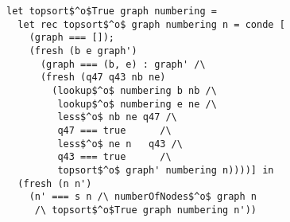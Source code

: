 \begin{figure}[!t]
  \centering
  \begin{minipage}{0.49\textwidth}
    \begin{lstlisting}[label={topsort_spec}, caption={Specialized relational intepreter for topologic sort of a graph}, captionpos=b, frame=tb]
let topsort$^o$True graph numbering =
  let rec topsort$^o$ graph numbering n = conde [
    (graph === []);
    (fresh (b e graph')
      (graph === (b, e) : graph' /\
      (fresh (q47 q43 nb ne)
        (lookup$^o$ numbering b nb /\
         lookup$^o$ numbering e ne /\
         less$^o$ nb ne q47 /\
         q47 === true      /\
         less$^o$ ne n   q43 /\
         q43 === true      /\
         topsort$^o$ graph' numbering n))))] in
  (fresh (n n')
    (n' === s n /\ numberOfNodes$^o$ graph n
     /\ topsort$^o$True graph numbering n'))
    \end{lstlisting}
  \end{minipage}
\end{figure}
